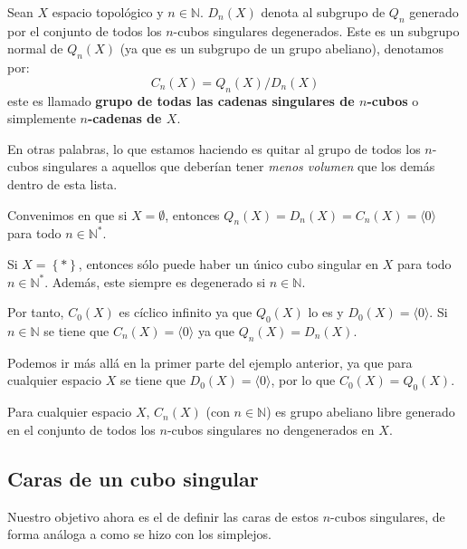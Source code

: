 \documentclass[12pt]{report}
\newcounter{it}
\theoremstyle{largebreak}
\newcommand\gen[1]{\ensuremath{\langle#1\rangle }}
\begin{document}
    \begin{mydef}
        Sean $X$ espacio topológico y $n\in\mathbb{N}$. $D_n(X)$ denota al subgrupo de $Q_n$ generado por el conjunto de todos los $n$-cubos singulares degenerados. Este es un subgrupo normal de $Q_n(X)$ (ya que es un subgrupo de un grupo abeliano), denotamos por:
        \begin{equation*}
            C_n(X)=Q_n(X)/D_n(X)
        \end{equation*}
        este es llamado \textbf{grupo de todas las cadenas singulares de $n$-cubos} o simplemente \textbf{$n$-cadenas de $X$}.
    \end{mydef}

    En otras palabras, lo que estamos haciendo es quitar al grupo de todos los $n$-cubos singulares a aquellos que deberían tener \textit{menos volumen} que los demás dentro de esta lista.

    Convenimos en que si $X=\emptyset$, entonces $Q_n(X)=D_n(X)=C_n(X)=\langle0\rangle$ para todo $n\in\mathbb{N}^*$.

    \begin{exa}
        Si $X=\left\{*\right\}$, entonces sólo puede haber un único cubo singular en $X$ para todo $n\in\mathbb{N}^*$. Además, este siempre es degenerado si $n\in\mathbb{N}$.

        Por tanto, $C_0(X)$ es cíclico infinito ya que $Q_0(X)$ lo es y $D_0(X)=\gen{0}$. Si $n\in\mathbb{N}$ se tiene que $C_n(X)=\gen{0}$ ya que $Q_n(X)=D_n(X)$.
    \end{exa}

    \begin{exa}
        Podemos ir más allá en la primer parte del ejemplo anterior, ya que para cualquier espacio $X$ se tiene que $D_0(X)=\gen{0}$, por lo que $C_0(X)=Q_0(X)$.
    \end{exa}

    \begin{exa}
        Para cualquier espacio $X$, $C_n(X)$ (con $n\in\mathbb{N}$) es grupo abeliano libre generado en el conjunto de todos los $n$-cubos singulares no dengenerados en $X$.
    \end{exa}

    \subsection{Caras de un cubo singular}

    Nuestro objetivo ahora es el de definir las caras de estos $n$-cubos singulares, de forma análoga a como se hizo con los simplejos.
\end{document}
